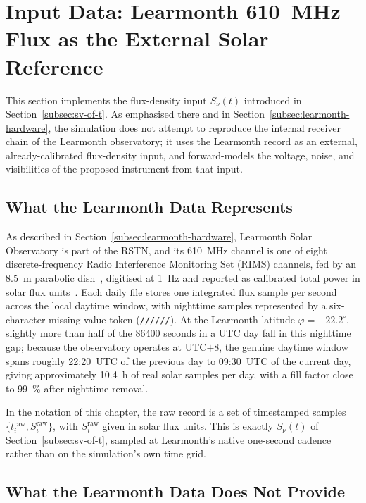 \section{Input Data: Learmonth 610~MHz Flux as the External Solar Reference}
\label{sec:data}

This section implements the flux-density input $S_\nu(t)$ introduced in
Section~\ref{subsec:sv-of-t}. As emphasised there and in
Section~\ref{subsec:learmonth-hardware}, the simulation does not attempt to
reproduce the internal receiver chain of the Learmonth observatory; it uses
the Learmonth record as an external, already-calibrated flux-density input,
and forward-models the voltage, noise, and visibilities of the proposed
instrument from that input.

\subsection{What the Learmonth Data Represents}
\label{subsec:learmonth-represents}

As described in Section~\ref{subsec:learmonth-hardware}, Learmonth Solar
Observatory is part of the RSTN, and its \SI{610}{\mega\hertz} channel is one
of eight discrete-frequency Radio Interference Monitoring Set (RIMS)
channels, fed by an \SI{8.5}{\metre} parabolic
dish~\citep{sws,sws_rims_metadata}, digitised at \SI{1}{\hertz} and reported
as calibrated total power in solar flux units~\citep{rstn_overview}. Each
daily file stores one integrated flux sample per second across the local
daytime window, with nighttime samples represented by a six-character
missing-value token (\texttt{//////}). At the Learmonth latitude
$\varphi=-22.2^\circ$, slightly more than half of the \num{86400} seconds in
a UTC day fall in this nighttime gap; because the observatory operates at
UTC$+8$, the genuine daytime window spans roughly 22:20~UTC of the previous
day to 09:30~UTC of the current day, giving approximately \SI{10.4}{\hour} of
real solar samples per day, with a fill factor close to \SI{99}{\percent}
after nighttime removal.

In the notation of this chapter, the raw record is a set of timestamped
samples $\{t_i^\mathrm{raw}, S_i^\mathrm{raw}\}$, with $S_i^\mathrm{raw}$
given in solar flux units. This is exactly $S_\nu(t)$ of
Section~\ref{subsec:sv-of-t}, sampled at Learmonth's native one-second
cadence rather than on the simulation's own time grid.

\subsection{What the Learmonth Data Does Not Provide}
\label{subsec:learmonth-limits}

